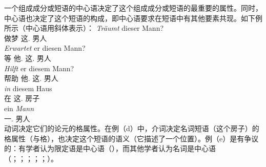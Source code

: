 一个组成成分或短语的中心语决定了这个组成成分或短语的最重要的属性。同时，中心语也决定了这个短语的构成，即中心语要求在短语中有其他要素共现。如下例所示（中心语用斜体表示）：
\eal
\ex 
\gll \emph{Träumt} dieser Mann?\\
     做梦 这.\nom{} 男人\\
\ex 
\gll \emph{Erwartet} er diesen Mann?\\
	 等 他.\nom{} 这.\acc{} 男人\\
\ex 
\gll \emph{Hilft} er diesem Mann?\\
	 帮助 他.\nom{} 这.\dat{} 男人\\
\ex 
\gll \emph{in} diesem Haus\\
	 在 这.\dat{} 房子\\
\ex 
\gll ein \emph{Mann}\\
	 一.\nom{} 男人\\
\zl
动词决定它们的论元的格属性。在例（d）中，介词决定名词短语（这个房子）的格属性（与格），也决定这个短语的语义（它描述了一个位置）。例（e）是有争议的：有学者认为限定语是中心语（\citealp{VH77a-u,Hellan86a,Abney87a,Netter94,Netter98a}），而其他学者认为名词是中心语（\citealp{vanLangendonck94a}；\citealp[]{ps2}；\citealp{Demske2001a}；\citealp[\S~6.6.1]{MuellerLehrbuch1}；\citealp{Hudson2004a}；\citealp{Bruening2009a}）。

